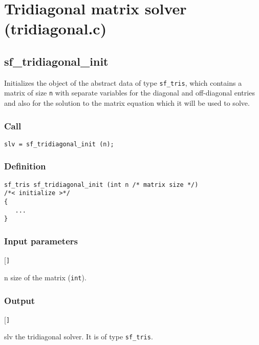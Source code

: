 \section{Tridiagonal matrix solver (tridiagonal.c)}




\subsection{{sf\_tridiagonal\_init}}
Initializes the object of the abstract data of type \texttt{sf\_tris}, which contains a matrix of size \texttt{n} with separate variables for the diagonal and off-diagonal entries and also for the solution to the matrix equation which it will be used to solve.

\subsubsection*{Call}
\begin{verbatim}slv = sf_tridiagonal_init (n);\end{verbatim}

\subsubsection*{Definition}
\begin{verbatim}
sf_tris sf_tridiagonal_init (int n /* matrix size */)
/*< initialize >*/
{
   ...
}
\end{verbatim}

\subsubsection*{Input parameters}
\begin{desclist}{\tt }{\quad}[\tt ]
   \setlength\itemsep{0pt}
   \item[n] size of the matrix (\texttt{int}).
\end{desclist}

\subsubsection*{Output}
\begin{desclist}{\tt }{\quad}[\tt ]
   \setlength\itemsep{0pt}
   \item[slv] the tridiagonal solver. It is of type \texttt{sf\_tris}.
\end{desclist}




